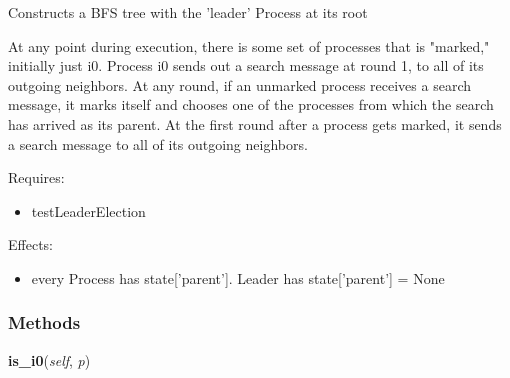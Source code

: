 Constructs a BFS tree with the 'leader' Process at its root

At any point during execution, there is some set of processes that is 
"marked," initially just i0. Process i0 sends out a search message at round
1, to all of its outgoing neighbors. At any round, if an unmarked process 
receives a search message, it marks itself and chooses one of the processes
from which the search has arrived as its parent. At the first round after a
process gets marked, it sends a search message to all of its outgoing 
neighbors.

Requires:

\begin{itemize}
\setlength{\parskip}{0.6ex}
  \item testLeaderElection

\end{itemize}

Effects:

\begin{itemize}
\setlength{\parskip}{0.6ex}
  \item every Process has state['parent']. Leader has state['parent'] = None

\end{itemize}



  \subsubsection{Methods}

    \label{datk:core:algs:SynchBFS:is_i0}

    \vspace{0.5ex}

\hspace{.8\funcindent}\begin{boxedminipage}{\funcwidth}

    \raggedright \textbf{is\_i0}(\textit{self}, \textit{p})

\setlength{\parskip}{2ex}
\setlength{\parskip}{1ex}
    \end{boxedminipage}

